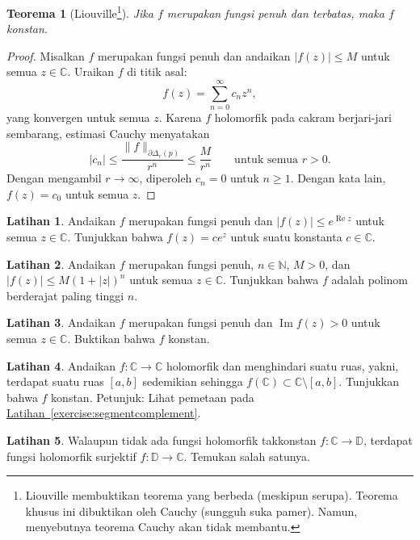 \documentclass[12pt,openany]{book}
\renewcommand{\Re}{\operatorname{Re}}
\renewcommand{\Im}{\operatorname{Im}}
\newcommand{\sabs}[1]{\lvert {#1} \rvert}
\newcommand{\snorm}[1]{\lVert {#1} \rVert}
\newcommand{\C}{{\mathbb{C}}}
\newcommand{\N}{{\mathbb{N}}}
\newcommand{\D}{{\mathbb{D}}}
\theoremstyle{plain}
\newtheorem{thm}{Teorema}[section]
\theoremstyle{remark}
\theoremstyle{definition}
\newenvironment{exbox}{%
    \def\FrameCommand{\vrule width 1pt \relax\hspace{10pt}}%
    \MakeFramed{\advance\hsize-\width\FrameRestore}%
}{%
    \endMakeFramed
}
\theoremstyle{exercise}
\newtheorem{exercise}{Latihan}[section]
\theoremstyle{example}
\newcommand{\exerciseref}[1]{\hyperref[#1]{Latihan~\ref*{#1}}}
\begin{document}
\begin{thm}[Liouville\footnote{%
Liouville membuktikan teorema yang berbeda (meskipun serupa).  Teorema khusus ini
dibuktikan oleh Cauchy (sungguh suka pamer).  Namun, menyebutnya teorema Cauchy akan
tidak membantu.}]
%
\label{thm:Liouville}%
Jika $f$ merupakan fungsi penuh dan terbatas, maka $f$ konstan.
\end{thm}

\begin{proof}
Misalkan $f$ merupakan fungsi penuh dan andaikan $\sabs{f(z)} \leq M$ untuk semua $z \in \C$.
Uraikan $f$ di titik asal:
\begin{equation*}
f(z) = \sum_{n=0}^\infty c_n z^n ,
\end{equation*}
yang konvergen untuk semua $z$.
Karena $f$ holomorfik pada cakram berjari-jari sembarang, estimasi Cauchy
menyatakan
\begin{equation*}
\sabs{c_n} \leq \frac{\snorm{f}_{\partial \Delta_r(p)}}{r^n} \leq
\frac{M}{r^n}
\qquad \text{untuk semua } r > 0 .
\end{equation*}
Dengan mengambil $r \to \infty$, diperoleh $c_n = 0$ untuk $n \geq 1$.  Dengan kata
lain, $f(z) = c_0$ untuk semua $z$.
\end{proof}

\begin{exbox}
\begin{exercise}
Andaikan $f$ merupakan fungsi penuh dan $\sabs{f(z)} \leq e^{\Re z}$ untuk semua $z \in
\C$.  Tunjukkan bahwa $f(z) = c e^z$ untuk suatu konstanta $c \in \C$.
\end{exercise}

\begin{exercise}
Andaikan $f$ merupakan fungsi penuh, $n \in \N$, $M > 0$, dan
$\sabs{f(z)} \leq M {(1+\sabs{z})}^n$ untuk semua $z \in \C$.
Tunjukkan bahwa $f$ adalah polinom berderajat paling tinggi $n$.
\end{exercise}

\begin{exercise}
Andaikan $f$ merupakan fungsi penuh dan $\Im f(z) > 0$ untuk semua $z \in \C$.
Buktikan bahwa $f$ konstan.
\end{exercise}

\begin{exercise}
Andaikan $f \colon \C \to \C$ holomorfik dan menghindari suatu ruas,
yakni, terdapat suatu ruas
$[a,b]$ sedemikian sehingga $f(\C) \subset \C \setminus [a,b]$.
Tunjukkan bahwa $f$ konstan.  Petunjuk: Lihat pemetaan pada
\exerciseref{exercise:segmentcomplement}.
\end{exercise}

\begin{exercise}
Walaupun tidak ada fungsi holomorfik takkonstan $f \colon \C
\to \D$, terdapat fungsi holomorfik surjektif $f \colon \D \to
\C$.  Temukan salah satunya.
\end{exercise}
\end{exbox}
\end{document}
